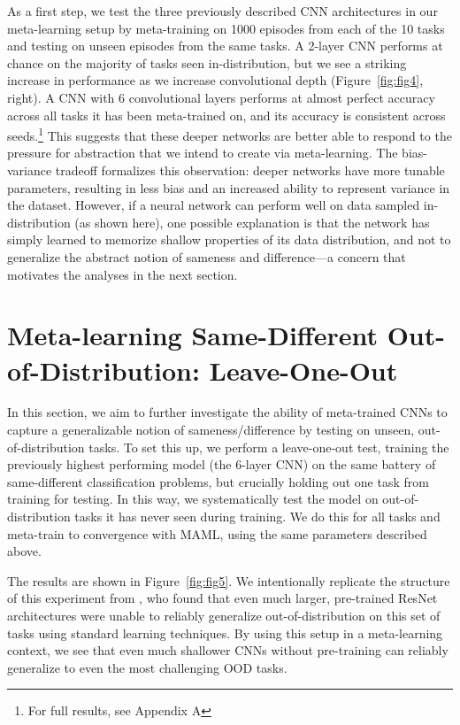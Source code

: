 \documentclass[10pt,letterpaper]{article}
\begin{document}
As a first step, we test the three previously described CNN architectures in our meta-learning setup by meta-training on 1000 episodes from each of the 10 tasks and testing on unseen episodes from the same tasks. A 2-layer CNN performs at chance on the majority of tasks seen in-distribution, but we see a striking increase in performance as we increase convolutional depth (Figure~\ref{fig:fig4}, right). A CNN with 6 convolutional layers performs at almost perfect accuracy across all tasks it has been meta-trained on, and its accuracy is consistent across seeds.\footnote{For full results, see Appendix A}
This suggests that these deeper networks are better able to respond to the pressure for abstraction that we intend to create via meta-learning.
The bias-variance tradeoff formalizes this observation: deeper networks have more tunable parameters, resulting in less bias and an increased ability to represent variance in the dataset. However, if a neural network can perform well on data sampled in-distribution (as shown here), one possible explanation is that the network has simply learned to memorize shallow properties of its data distribution, and not to generalize the abstract notion of sameness and difference---a concern that motivates the analyses in the next section.


\section{Meta-learning Same-Different Out-of-Distribution: Leave-One-Out}

In this section, we aim to further investigate the ability of meta-trained CNNs to capture a generalizable notion of sameness/difference by testing on unseen, out-of-distribution tasks. To set this up, we perform a leave-one-out test, training the previously highest performing model (the 6-layer CNN) on the same battery of same-different classification problems, but crucially holding out one task from training for testing. In this way, we systematically test the model on out-of-distribution tasks it has never seen during training. We do this for all tasks and meta-train to convergence with MAML, using the same parameters described above. 

The results are shown in Figure~\ref{fig:fig5}. 
We intentionally replicate the structure of this experiment from , who found that even much larger, pre-trained ResNet architectures were unable to reliably generalize out-of-distribution on this set of tasks using standard learning techniques. By using this setup in a meta-learning context, we see that even much shallower CNNs without pre-training can reliably generalize to even the most challenging OOD tasks.  
\end{document}

